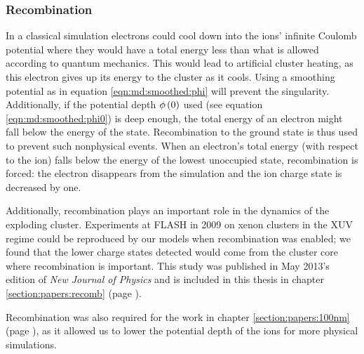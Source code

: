
\subsubsection{Recombination}

In a classical simulation electrons could cool down into the ions' infinite Coulomb
potential where they would have a total energy less than what is allowed
according to quantum mechanics. This would lead to artificial cluster heating,
as this electron gives up its energy to the cluster as it cools.
Using a smoothing potential as in equation
\eqref{eqn:md:smoothed:phi} will prevent the singularity.
Additionally, if the potential depth $\phi\left( 0 \right)$ used (see
equation \eqref{eqn:md:smoothed:phi0}) is deep enough, the total energy of an
electron might fall below the energy of the state.
Recombination to the ground state is thus used to prevent such nonphysical events.
When an electron's total energy (with respect to the ion) falls below the energy
of the lowest unoccupied state,
recombination is forced: the electron disappears from the simulation and the ion
charge state is decreased by one.

Additionally, recombination plays an important role in the dynamics of the
exploding cluster. Experiments at FLASH in 2009 on xenon clusters in the XUV
regime\cite{Thomas2009} could be reproduced by our models when recombination
was enabled; we found that the lower charge states detected would come from the
cluster core where recombination is important. This study was published in
May 2013's edition of \textit{New Journal of Physics}\cite{Ackad2013} and is
included in this thesis in chapter \ref{section:papers:recomb}
(page \pageref{section:papers:recomb}).

Recombination was also required for the work in chapter
\ref{section:papers:100nm} (page \pageref{section:papers:100nm}),
as it allowed us to lower the potential depth of the
ions for more physical simulations.

